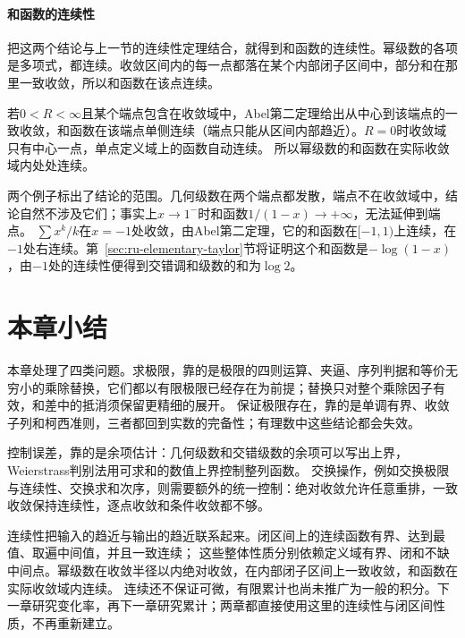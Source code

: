 \paragraph{和函数的连续性}
把这两个结论与上一节的连续性定理结合，就得到和函数的连续性。幂级数的各项是多项式，都连续。收敛区间内的每一点都落在某个内部闭子区间中，部分和在那里一致收敛，所以和函数在该点连续。

若$0<R<\infty$且某个端点包含在收敛域中，Abel第二定理给出从中心到该端点的一致收敛，和函数在该端点单侧连续（端点只能从区间内部趋近）。$R=0$时收敛域只有中心一点，单点定义域上的函数自动连续。
所以幂级数的和函数在实际收敛域内处处连续。

两个例子标出了结论的范围。几何级数在两个端点都发散，端点不在收敛域中，结论自然不涉及它们；事实上$x\to1^-$时和函数$1/(1-x)\to+\infty$，无法延伸到端点。
$\sum x^k/k$在$x=-1$处收敛，由Abel第二定理，它的和函数在$[-1,1)$上连续，在$-1$处右连续。第~\ref{sec:ru-elementary-taylor}节将证明这个和函数是$-\log(1-x)$，由$-1$处的连续性便得到交错调和级数的和为$\log2$。

\FloatBarrier
\section{本章小结}
\label{sec:function-limits-summary}

本章处理了四类问题。求极限，靠的是极限的四则运算、夹逼、序列判据和等价无穷小的乘除替换，它们都以有限极限已经存在为前提；替换只对整个乘除因子有效，和差中的抵消须保留更精细的展开。
保证极限存在，靠的是单调有界、收敛子列和柯西准则，三者都回到实数的完备性；有理数中这些结论都会失效。

控制误差，靠的是余项估计：几何级数和交错级数的余项可以写出上界，Weierstrass判别法用可求和的数值上界控制整列函数。
交换操作，例如交换极限与连续性、交换求和次序，则需要额外的统一控制：绝对收敛允许任意重排，一致收敛保持连续性，逐点收敛和条件收敛都不够。

连续性把输入的趋近与输出的趋近联系起来。闭区间上的连续函数有界、达到最值、取遍中间值，并且一致连续；
这些整体性质分别依赖定义域有界、闭和不缺中间点。幂级数在收敛半径以内绝对收敛，在内部闭子区间上一致收敛，和函数在实际收敛域内连续。
连续还不保证可微，有限累计也尚未推广为一般的积分。下一章研究变化率，再下一章研究累计；两章都直接使用这里的连续性与闭区间性质，不再重新建立。
